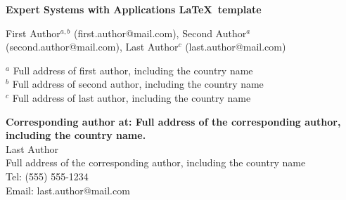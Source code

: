 \documentclass[review]{elsarticle}
\begin{document}
	\begin{frontmatter}
		
		
		\begin{titlepage}
			\begin{center}
				\vspace*{1cm}
				
				\textbf{ \large Expert Systems with Applications \LaTeX\ template}
				
				\vspace{1.5cm}
				
				First Author$^{a,b}$ (first.author@mail.com), Second Author$^a$ (second.author@mail.com), Last Author$^c$ (last.author@mail.com) \\
				
				\hspace{10pt}
				
				\begin{flushleft}
					\small  
					$^a$ Full address of first author, including the country name \\
					$^b$ Full address of second author, including the country name \\
					$^c$ Full address of last author, including the country name
					
					\begin{comment}
						Clearly indicate who will handle correspondence at all stages of refereeing and publication, also post-publication. Ensure that phone numbers (with country and area code) are provided in addition to the e-mail address and the complete postal address. Contact details must be kept up to date by the corresponding author.
					\end{comment}
					
					\vspace{1cm}
					\textbf{Corresponding author at: Full address of the corresponding author, including the country name.} \\
					Last Author \\
					Full address of the corresponding author, including the country name \\
					Tel: (555) 555-1234 \\
					Email: last.author@mail.com
					

\end{flushleft}
\end{center}
\end{titlepage}
\end{frontmatter}
\end{document}
